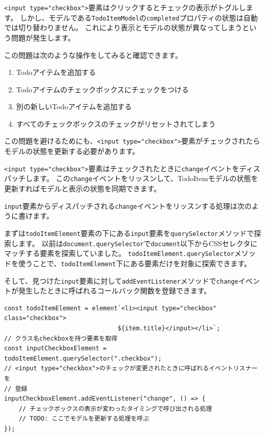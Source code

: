 \texttt{<input type="checkbox">}要素はクリックするとチェックの表示がトグルします。
しかし、モデルである\texttt{TodoItemModel}の\texttt{completed}プロパティの状態は自動では切り替わりません。
これにより表示とモデルの状態が異なってしまうという問題が発生します。

この問題は次のような操作をしてみると確認できます。

\begin{enumerate}
\def\labelenumi{\arabic{enumi}.}
\item
  Todoアイテムを追加する
\item
  Todoアイテムのチェックボックスにチェックをつける
\item
  別の新しいTodoアイテムを追加する
\item
  すべてのチェックボックスのチェックがリセットされてしまう
\end{enumerate}

この問題を避けるためにも、\texttt{<input type="checkbox">}要素がチェックされたらモデルの状態を更新する必要があります。

\texttt{<input type="checkbox">}要素はチェックされたときに\texttt{change}イベントをディスパッチします。
この\texttt{change}イベントをリッスンして、TodoItemモデルの状態を更新すればモデルと表示の状態を同期できます。

\texttt{input}要素からディスパッチされる\texttt{change}イベントをリッスンする処理は次のように書けます。

まずは\texttt{todoItemElement}要素の下にある\texttt{input}要素を\texttt{querySelector}メソッドで探索します。
以前は\texttt{document.querySelector}で\texttt{document}以下からCSSセレクタにマッチする要素を探索していました。
\texttt{todoItemElement.querySelector}メソッドを使うことで、\texttt{todoItemElement}下にある要素だけを対象に探索できます。

そして、見つけた\texttt{input}要素に対して\texttt{addEventListener}メソッドで\texttt{change}イベントが発生したときに呼ばれるコールバック関数を登録できます。

\begin{lstlisting}
const todoItemElement = element`<li><input type="checkbox" class="checkbox">
                               ${item.title}</input></li>`;
// クラス名checkboxを持つ要素を取得
const inputCheckboxElement = todoItemElement.querySelector(".checkbox");
// <input type="checkbox">のチェックが変更されたときに呼ばれるイベントリスナーを
// 登録
inputCheckboxElement.addEventListener("change", () => {
    // チェックボックスの表示が変わったタイミングで呼び出される処理
    // TODO: ここでモデルを更新する処理を呼ぶ
});
\end{lstlisting}

